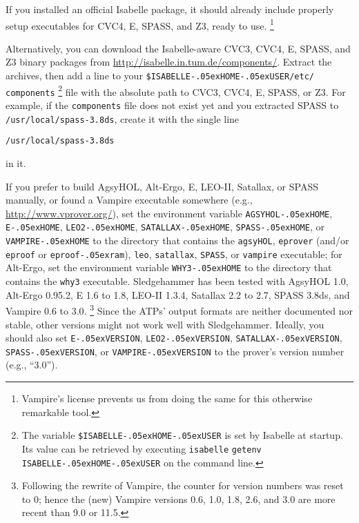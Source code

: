 \documentclass[a4paper,12pt]{article}
\newcommand\download{\url{http://isabelle.in.tum.de/components/}}
\renewcommand\_{\hbox{\textunderscore\kern-.05ex}}
\begin{document}
\begin{sloppy}
\begin{enum}
\item[\labelitemi] If you installed an official Isabelle package, it should
already include properly setup executables for CVC4, E, SPASS, and Z3, ready to use.%
\footnote{Vampire's license prevents us from doing the same for
this otherwise remarkable tool.}

\item[\labelitemi] Alternatively, you can download the Isabelle-aware CVC3,
CVC4, E, SPASS, and Z3 binary packages from \download. Extract the archives,
then add a line to your \texttt{\$ISABELLE\_HOME\_USER\slash etc\slash
components}%
\footnote{The variable \texttt{\$ISABELLE\_HOME\_USER} is set by Isabelle at
startup. Its value can be retrieved by executing \texttt{isabelle}
\texttt{getenv} \texttt{ISABELLE\_HOME\_USER} on the command line.}
file with the absolute path to CVC3, CVC4, E, SPASS, or Z3. For example, if the
\texttt{components} file does not exist yet and you extracted SPASS to
\texttt{/usr/local/spass-3.8ds}, create it with the single line

\prew
\texttt{/usr/local/spass-3.8ds}
\postw

in it.

\item[\labelitemi] If you prefer to build AgsyHOL, Alt-Ergo, E, LEO-II,
Satallax, or SPASS manually, or found a Vampire executable somewhere (e.g.,
\url{http://www.vprover.org/}), set the environment variable
\texttt{AGSYHOL\_HOME}, \texttt{E\_HOME}, \texttt{LEO2\_HOME},
\texttt{SATALLAX\_HOME}, \texttt{SPASS\_HOME}, or
\texttt{VAMPIRE\_HOME} to the directory that contains the \texttt{agsyHOL},
\texttt{eprover} (and/or \texttt{eproof} or \texttt{eproof\_ram}),
\texttt{leo}, \texttt{satallax}, \texttt{SPASS}, or \texttt{vampire} executable;
for Alt-Ergo, set the
environment variable \texttt{WHY3\_HOME} to the directory that contains the
\texttt{why3} executable.
Sledgehammer has been tested with AgsyHOL 1.0, Alt-Ergo 0.95.2, E 1.6 to 1.8,
LEO-II 1.3.4, Satallax 2.2 to 2.7, SPASS 3.8ds, and Vampire 0.6 to 3.0.%
\footnote{Following the rewrite of Vampire, the counter for version numbers was
reset to 0; hence the (new) Vampire versions 0.6, 1.0, 1.8, 2.6, and 3.0 are more
recent than 9.0 or 11.5.}%
Since the ATPs' output formats are neither documented nor stable, other
versions might not work well with Sledgehammer. Ideally,
you should also set \texttt{E\_VERSION}, \texttt{LEO2\_VERSION},
\texttt{SATALLAX\_VERSION}, \texttt{SPASS\_VERSION}, or
\texttt{VAMPIRE\_VERSION} to the prover's version number (e.g., ``3.0'').


\end{enum}
\end{sloppy}
\end{document}
